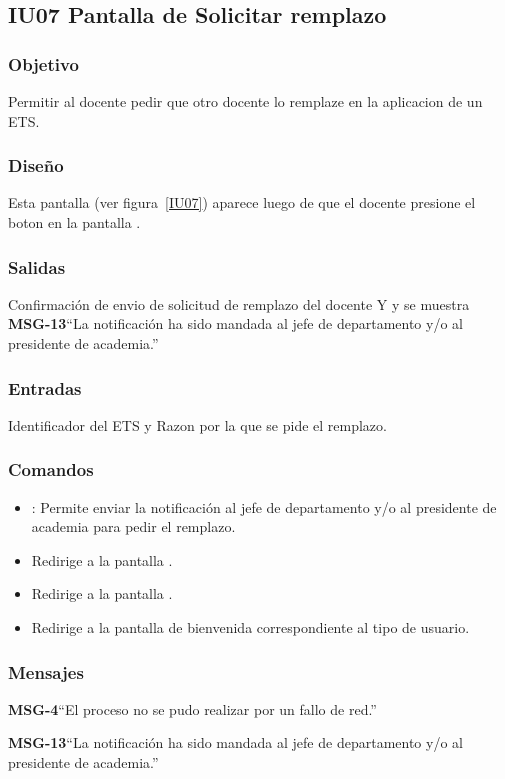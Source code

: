 \subsection{IU07 Pantalla de Solicitar remplazo}

\subsubsection{Objetivo}
Permitir al docente pedir que otro docente lo remplaze en la aplicacion de un ETS.

\subsubsection{Diseño}
Esta pantalla  (ver figura~\ref{IU07}) aparece luego de que el docente presione el boton  en la pantalla .


\subsubsection{Salidas}
Confirmación de envio de solicitud de remplazo del docente Y y se muestra {\bf MSG-13}{``La notificación ha sido mandada al jefe de departamento y/o al presidente de academia.''}

\subsubsection{Entradas}
Identificador del ETS y Razon por la que se pide el remplazo.

\subsubsection{Comandos}
\begin{itemize}
	\item {}: Permite enviar la notificación al jefe de departamento y/o al presidente de academia para pedir el remplazo.
	\item {} Redirige a la pantalla .
    \item {} Redirige a la pantalla .
    \item {} Redirige a la pantalla de bienvenida correspondiente al tipo de usuario.
\end{itemize}

\subsubsection{Mensajes}

\begin{Citemize}
	\item {\bf MSG-4}{``El proceso no se pudo realizar por un fallo de red.''}
	\item {\bf MSG-13}{``La notificación ha sido mandada al jefe de departamento y/o al presidente de academia.''}
\end{Citemize}

